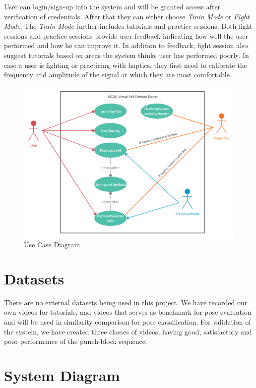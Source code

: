 User can login/sign-up into the system and will be granted access after verification of credentials. After that they can either choose \textit{Train Mode} or \textit{Fight Mode}. The \textit{Train Mode} further includes tutorials and practice sessions. Both fight sessions and practice sessions provide user feedback indicating how well the user performed and how he can improve it. In addition to feedback, fight session also suggest tutorials based on areas the system thinks user has performed poorly. In case a user is fighting or practicing with haptics, they first need to calibrate the frequency and amplitude of the signal at which they are most comfortable.


\begin{figure}
    \centering
    \includegraphics[scale=0.28]{images/UseCaseDiagram.png}
    \caption{Use Case Diagram}
    \label{fig:usecase}
\end{figure}


\section{Datasets}

There are no external datasets being used in this project. We have recorded our own videos for tutorials, and videos that serves as benchmark for pose evaluation and will be used in similarity comparison for pose classification. For validation of the system, we have created three classes of videos, having good, satisfactory and poor performance of the punch-block sequence.

\section{System Diagram}

